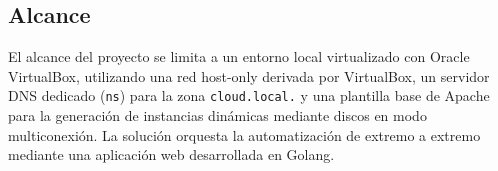 \subsection{Alcance}
El alcance del proyecto se limita a un entorno local virtualizado con Oracle VirtualBox, utilizando una red host-only derivada por VirtualBox, un servidor DNS dedicado (\texttt{ns}) para la zona \texttt{cloud.local.} y una plantilla base de Apache para la generación de instancias dinámicas mediante discos en modo multiconexión. La solución orquesta la automatización de extremo a extremo mediante una aplicación web desarrollada en Golang.

